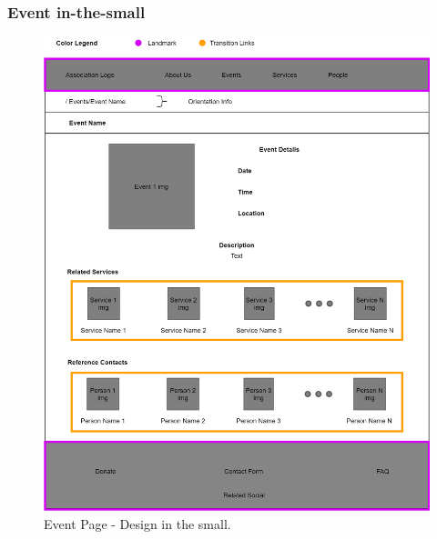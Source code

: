 \subsubsection{Event in-the-small}
\begin{figure}[h!]
		\centering
		\begin{minipage}[b]{1\textwidth}
    			\includegraphics[width=\textwidth]{./assets/eventdetails.png}
			\caption{Event Page - Design in the small.}
		\end{minipage}
\end{figure}
\FloatBarrier

\clearpage

